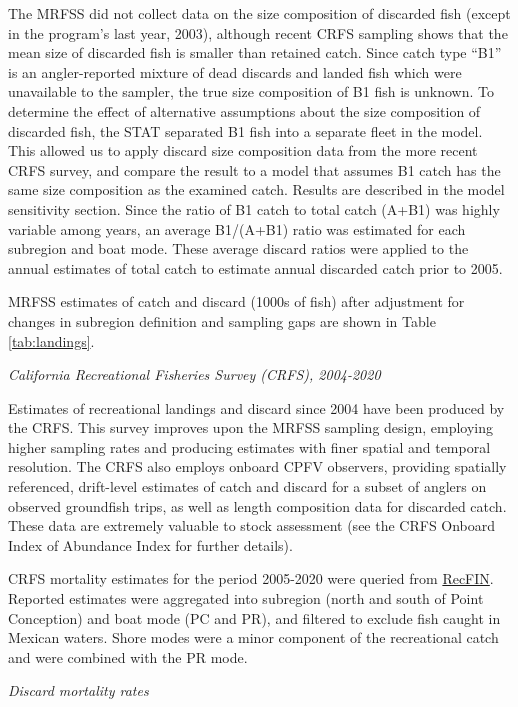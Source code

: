 \documentclass[11pt,
  english,
]{article}
\begin{document}
The MRFSS did not collect data on the size composition of discarded fish (except in the program's last year, 2003), although recent CRFS sampling shows that the mean size of discarded fish is smaller than retained catch. Since catch type ``B1'' is an angler-reported mixture of dead discards and landed fish which were unavailable to the sampler, the true size composition of B1 fish is unknown. To determine the effect of alternative assumptions about the size composition of discarded fish, the STAT separated B1 fish into a separate fleet in the model. This allowed us to apply discard size composition data from the more recent CRFS survey, and compare the result to a model that assumes B1 catch has the same size composition as the examined catch. Results are described in the model sensitivity section. Since the ratio of B1 catch to total catch (A+B1) was highly variable among years, an average B1/(A+B1) ratio was estimated for each subregion and boat mode. These average discard ratios were applied to the annual estimates of total catch to estimate annual discarded catch prior to 2005.

MRFSS estimates of catch and discard (1000s of fish) after adjustment for changes in subregion definition and sampling gaps are shown in Table \ref{tab:landings}.

\emph{California Recreational Fisheries Survey (CRFS), 2004-2020}

Estimates of recreational landings and discard since 2004 have been produced by the CRFS. This survey improves upon the MRFSS sampling design, employing higher sampling rates and producing estimates with finer spatial and temporal resolution. The CRFS also employs onboard CPFV observers, providing spatially referenced, drift-level estimates of catch and discard for a subset of anglers on observed groundfish trips, as well as length composition data for discarded catch. These data are extremely valuable to stock assessment (see the CRFS Onboard Index of Abundance Index for further details).

CRFS mortality estimates for the period 2005-2020 were queried from {\href{www.recfin.org}{RecFIN}\leavevmode\tagmcend\tagstructend}. Reported estimates were aggregated into subregion (north and south of Point Conception) and boat mode (PC and PR), and filtered to exclude fish caught in Mexican waters. Shore modes were a minor component of the recreational catch and were combined with the PR mode.

\emph{Discard mortality rates}
\end{document}
